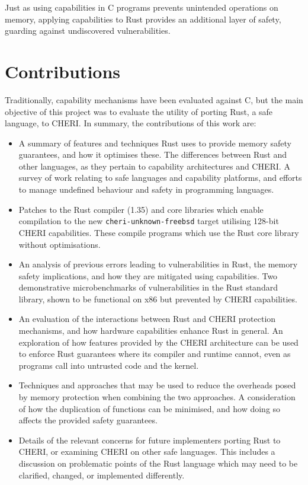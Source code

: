 \documentclass[dissertation.tex]{subfiles}
\begin{document}
Just as using capabilities in C programs prevents unintended operations
on memory, applying capabilities to Rust provides an additional layer of
safety, guarding against undiscovered vulnerabilities.


\section{Contributions}
\label{sec:intro-contrib}

Traditionally, capability mechanisms have been evaluated against C, but
the main objective of this project was to evaluate the utility of
porting Rust, a safe language, to CHERI.
In summary, the contributions of this work are:

\begin{itemize}
    \item A summary of features and techniques Rust uses to provide
    memory safety guarantees, and how it optimises these.
    The differences between Rust and other languages, as they pertain to
    capability architectures and CHERI.
    A survey of work relating to safe languages and capability
    platforms, and efforts to manage undefined behaviour and safety in
    programming languages.

    \item Patches to the Rust compiler (1.35) and core libraries which
    enable compilation to the new \texttt{cheri-unknown-freebsd} target
    utilising 128-bit CHERI capabilities.
    These compile programs which use the Rust core library without
    optimisations.

    \item An analysis of previous errors leading to vulnerabilities in
    Rust, the memory safety implications, and how they are mitigated
    using capabilities.
    Two demonstrative microbenchmarks of vulnerabilities in the Rust
    standard library, shown to be functional on x86 but prevented by
    CHERI capabilities.

    \item An evaluation of the interactions between Rust and CHERI
    protection mechanisms, and how hardware capabilities enhance Rust in
    general.
    An exploration of how features provided by the CHERI architecture
    can be used to enforce Rust guarantees where its compiler and
    runtime cannot, even as programs call into untrusted code and the
    kernel.

    \item Techniques and approaches that may be used to reduce the
    overheads posed by memory protection when combining the two
    approaches.
    A consideration of how the duplication of functions can be
    minimised, and how doing so affects the provided safety guarantees.

    \item Details of the relevant concerns for future implementers
    porting Rust to CHERI, or examining CHERI on other safe languages.
    This includes a discussion on problematic points of the Rust
    language which may need to be clarified, changed, or implemented
    differently.
\end{itemize}
\end{document}
